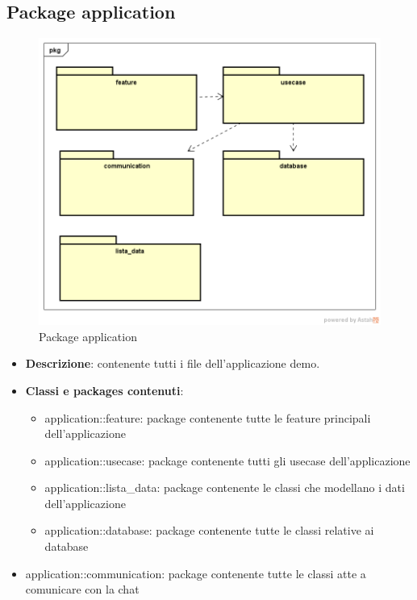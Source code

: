 \subsection{Package application}
\label{Package application}
\begin{figure}[H]
	\centering
	\includegraphics[scale=0.5]{Sezioni/Packages/Application/application.png}
	\caption{Package application}
\end{figure}
\begin{itemize}
	\item \textbf{Descrizione}:  contenente tutti i file dell'applicazione demo.
	\item \textbf{Classi e packages contenuti}:
	\begin{itemize}
		\item application::feature: package contenente tutte le feature principali dell'applicazione
		\item application::usecase: package contenente tutti gli usecase dell'applicazione
		\item application::lista\_data: package contenente le classi che modellano i dati dell'applicazione
		\item application::database: package contenente tutte le classi relative ai database
	\end{itemize}
	\item application::communication: package contenente tutte le classi atte a comunicare con la chat
\end{itemize}


